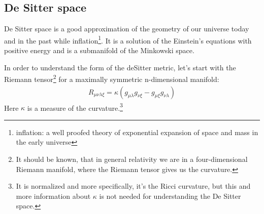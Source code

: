 \subsection{De Sitter space \checkmark} 
	De Sitter space is a good approximation of the geometry of our universe today and in the past while inflation\footnote{inflation: a well proofed theory of exponential expansion of space and mass in the early universe}. It is a solution of the Einstein's equations with positive energy and is a submanifold of the Minkowski space.
	
	
	In order to understand the form of the deSitter metric, let's start with the Riemann tensor\footnote{It should be known, that in general relativity we are in a four-dimensional Riemann manifold, where the Riemann tensor gives us the curvature.} for a  maximally symmetric n-dimensional manifold: 
		\begin{align}
			R_{\mu \nu \lambda \xi} = \kappa (g_{\mu \lambda} g_{\nu \xi} - g_{\mu \xi} g_{\nu \lambda})
		\end{align}
	Here $\kappa$ is a measure of the curvature.\footnote{It is normalized and more specifically, it's the Ricci curvature, but this and more information about $\kappa$ is not needed for understanding the De Sitter space.}
	
